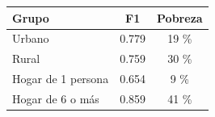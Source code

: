 
\begin{tabular}[t]{lcc}
\toprule
Grupo & F1 & Pobreza\\
\midrule
Urbano & 0.779 & 19 \%\\
Rural & 0.759 & 30 \%\\
Hogar de 1 persona & 0.654 & 9 \%\\
Hogar de 6 o más & 0.859 & 41 \%\\
\bottomrule
\end{tabular}
